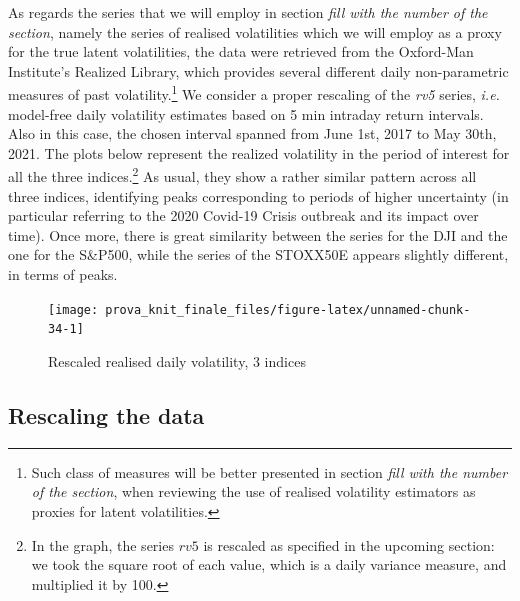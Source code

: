 \documentclass[
]{book}
\theoremstyle{break}
\theoremstyle{nonumberplain}
\begin{document}
As regards the series that we will employ in section
\textit{fill with the number of the section}, namely the series of
realised volatilities which we will employ as a proxy for the true
latent volatilities, the data were retrieved from the Oxford-Man
Institute's Realized Library, which provides several different daily
non-parametric measures of past
volatility.\footnote{Such class of measures will be better presented in section \textit{fill with the number of the section}, when reviewing the use of realised volatility estimators as proxies for latent volatilities.}
We consider a proper rescaling of the \textit{rv5} series, \textit{i.e.}
model-free daily volatility estimates based on 5 min intraday return
intervals. Also in this case, the chosen interval spanned from June 1st,
2017 to May 30th, 2021. The plots below represent the realized
volatility in the period of interest for all the three
indices.\footnote{In the graph, the series $rv5$ is rescaled as specified in the upcoming section: we took the square root of each value, which is a daily variance measure, and multiplied it by 100.}
As usual, they show a rather similar pattern across all three indices,
identifying peaks corresponding to periods of higher uncertainty (in
particular referring to the 2020 Covid-19 Crisis outbreak and its impact
over time). Once more, there is great similarity between the series for
the DJI and the one for the S\&P500, while the series of the STOXX50E
appears slightly different, in terms of peaks.

\begin{figure}[H]

{\centering \texttt{[image: prova\_knit\_finale\_files/figure-latex/unnamed-chunk-34-1]} 

}

\caption{Rescaled realised daily volatility, 3 indices}\label{fig:unnamed-chunk-34}
\end{figure}

\subsection{Rescaling the data}
\end{document}
